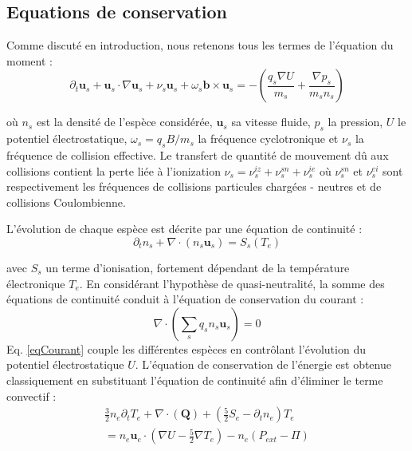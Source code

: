 \subsection{Equations de conservation}
Comme discuté en introduction, nous retenons tous les termes de l'équation du moment :
\begin{equation}
	\partial_t \mathbf{u}_s + \mathbf{u}_s\cdot\nabla\mathbf{u}_s+\nu_s\mathbf{u}_s+\omega_s\mathbf{b}\times\mathbf{u}_s=-(\frac{q_s\nabla U}{m_s}+\frac{\nabla p_s}{m_sn_s})
\end{equation}

où $n_s$ est la densité de l'espèce considérée, $\mathbf{u}_s$ sa vitesse fluide, $p_s$ la pression, $U$ le potentiel électrostatique,
$\omega_s=q_sB/m_s$ la fréquence cyclotronique et $\nu_s$ la fréquence de collision effective.
Le transfert de quantité de mouvement dû aux collisions contient la perte liée à l'ionization $\nu_s=\nu_{s}^{iz}+\nu_{s}^{sn}+\nu_{s}^{ie}$
où $\nu_{s}^{sn}$ et $\nu_{s}^{ei}$ sont respectivement les fréquences de collisions particules chargées - neutres et de collisions Coulombienne.

L'évolution de chaque espèce est décrite par une équation de continuité :
\begin{equation}
	\partial_t n_s + \nabla\cdot\left(n_s\mathbf{u}_s\right)=S_s(T_e)
\end{equation}

avec $S_s$ un terme d'ionisation, fortement dépendant de 
la température électronique $T_e$. En considérant l'hypothèse de quasi-neutralité, la somme des équations de continuité 
conduit à l'équation de conservation du courant :
\begin{equation}
	\label{eqCourant}
	\nabla\cdot(\sum_sq_sn_s\mathbf{u}_s)=0
\end{equation}
Eq. \ref{eqCourant} couple les différentes espèces en contrôlant l'évolution du potentiel électrostatique $U$.
L'équation de conservation de l'énergie est obtenue classiquement en substituant l'équation de continuité 
afin d'éliminer le terme convectif :
\begin{equation}\begin{split}
\frac{3}{2}n_e\partial_tT_e + \nabla\cdot(\mathbf{Q}) + \left(\frac{5}{2}S_e-\partial_tn_e\right)T_e
\\=n_e\mathbf{u}_e\cdot\left(\nabla U-\frac{5}{2}\nabla T_e\right)-n_e\left(P_{ext}-\Pi\right)
\end{split}
\end{equation}

